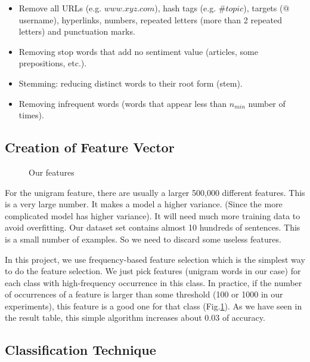 \begin{itemize}
    \item Remove all URLs (e.g. $www.xyz.com$), hash tags (e.g. $\#topic$), targets ($@$username), hyperlinks, numbers, repeated letters (more than 2 repeated letters) and punctuation marks.
    \item Removing stop words that add no sentiment value (articles, some prepositions, etc.).
    \item Stemming: reducing distinct words to their root form (stem).
    \item Removing infrequent words (words that appear less than $n_{min}$ number of times).
\end{itemize}

\subsection{Creation of Feature Vector}
\label{sec: Creation of Feature Vector}
 

\begin{figure}[!ht]
    \caption{\label{fig_feature_vector} Our features}
\end{figure}


For the unigram feature, there are usually a larger 500,000 different features. This is a very large number. It makes a model a higher variance. (Since the more complicated model has higher variance). It will need much more training data to avoid overfitting. Our dataset set contains almost 10 hundreds of sentences. This is a small number of examples. So we need to discard some useless features.

In this project, we use frequency-based feature selection which is the simplest way to do the feature selection. We just pick features (unigram words in our case) for each class with high-frequency occurrence in this class. In practice, if the number of occurrences of a feature is larger than some threshold (100 or 1000 in our experiments), this feature is a good one for that class (Fig.\ref{fig_feature_vector}). As we have seen in the result table, this simple algorithm increases about 0.03 of accuracy.



\subsection{Classification Technique}
\label{sec: Classification Technique}

